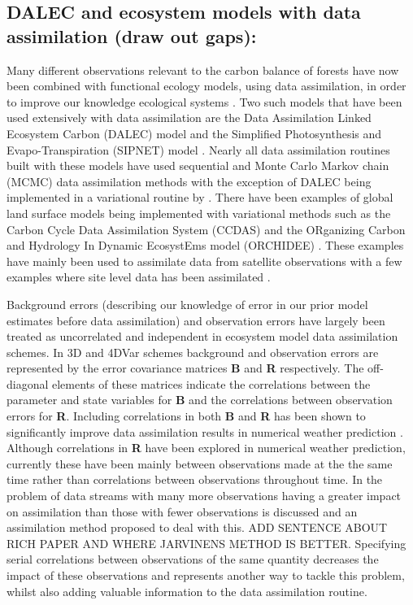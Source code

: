 \documentclass[11pt]{article}
\begin{document}
\subsection{DALEC and ecosystem models with data assimilation (draw out gaps):}
Many different observations relevant to the carbon balance of forests have now been combined with functional ecology models, using data assimilation, in order to improve our knowledge ecological systems \citep{zobitz2011primer, fox2009reflex, richardson2010estimating, Quaife2008, Zobitz2014, Niu2014}. Two such models that have been used extensively with data assimilation are the Data Assimilation Linked Ecosystem Carbon (DALEC) model \citep{williams2005improved} and the Simplified Photosynthesis and Evapo-Transpiration (SIPNET) model \citep{braswell2005estimating}. Nearly all data assimilation routines built with these models have used sequential and Monte Carlo Markov chain (MCMC) data assimilation methods with the exception of DALEC being implemented in a variational routine by \citet{delahaies2013regularization}. There have been examples of global land surface models being implemented with variational methods such as the Carbon Cycle Data Assimilation System (CCDAS) \citep{Kaminski2013} and the ORganizing Carbon and Hydrology In Dynamic EcosystEms model (ORCHIDEE) \citep{Krinner2005}. These examples have mainly been used to assimilate data from satellite observations with a few examples where site level data has been assimilated \citep{Verbeeck2011, Bacour2015}.

Background errors (describing our knowledge of error in our prior model estimates before data assimilation) and observation errors have largely been treated as uncorrelated and independent in ecosystem model data assimilation schemes. In 3D and 4DVar schemes background and observation errors are represented by the error covariance matrices \textbf{B} and \textbf{R} respectively. The off-diagonal elements of these matrices indicate the correlations between the parameter and state variables for \textbf{B} and the correlations between observation errors for \textbf{R}. Including correlations in both \textbf{B} and \textbf{R} has been shown to significantly improve data assimilation results in numerical weather prediction \citep{fisher2003background, Stewart2013}. Although correlations in \textbf{R} have been explored in numerical weather prediction, currently these have been mainly between observations made at the the same time rather than correlations between observations throughout time. In \citet{richardson2010estimating} the problem of data streams with many more observations having a greater impact on assimilation than those with fewer observations is discussed and an assimilation method proposed to deal with this. ADD SENTENCE ABOUT RICH PAPER AND WHERE JARVINENS METHOD IS BETTER. Specifying serial correlations between observations of the same quantity decreases the impact of these observations \citep{jarvinen1999variational} and represents another way to tackle this problem, whilst also adding valuable information to the data assimilation routine. 
\end{document}
